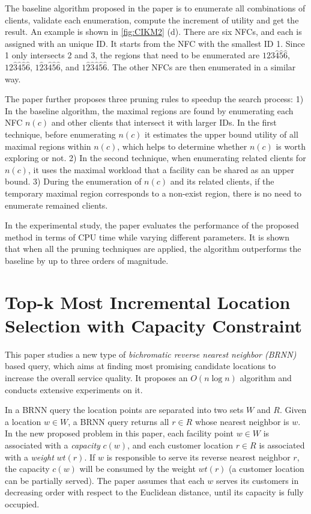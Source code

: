 \documentclass[paper=a4, fontsize=18pt]{article} %
\numberwithin{equation}{section} %
\numberwithin{figure}{section} %
\numberwithin{table}{section} %
\begin{document}
The baseline algorithm proposed in the paper is to enumerate all combinations of clients, validate each enumeration, compute the increment of utility and get the result. An example is shown in \ref{fig:CIKM2} (d). There are six NFCs, and each is assigned with an unique ID. It starts from the NFC with the smallest ID 1. Since 1 only intersects 2 and 3, the regions that need to be enumerated are $123\hat{4}\hat{5}\hat{6}$, $12\hat{3}\hat{4}\hat{5}\hat{6}$, $1\hat{2}3\hat{4}\hat{5}\hat{6}$, and $1\hat{2}\hat{3}\hat{4}\hat{5}\hat{6}$. The other NFCs are then enumerated in a similar way.

The paper further proposes three pruning rules to speedup the search process: 1) In the baseline algorithm, the maximal regions are found by enumerating each NFC $n(c)$ and other clients that intersect it with larger IDs. In the first technique, before enumerating $n(c)$ it estimates the upper bound utility of all maximal regions within $n(c)$, which helps to determine whether $n(c)$ is worth exploring or not. 2) In the second technique, when enumerating related clients for $n(c)$, it uses the maximal workload that a facility can be shared as an upper bound. 3) During the enumeration of $n(c)$ and its related clients, if the temporary maximal region corresponds to a non-exist region, there is no need to enumerate remained clients.

In the experimental study, the paper evaluates the performance of the proposed method in terms of CPU time while varying different parameters. It is shown that when all the pruning techniques are applied, the algorithm outperforms the baseline by up to three orders of magnitude.

\section{Top-k Most Incremental Location Selection with Capacity Constraint \cite{SHCDZ12}}

This paper studies a new type of \emph{bichromatic reverse nearest neighbor (BRNN)} based query, which aims at finding most promising candidate locations to increase the overall service quality. It proposes an $O(n \log n)$ algorithm and conducts extensive experiments on it.

In a BRNN query the location points are separated into two sets $W$ and $R$. Given a location $w \in W$, a BRNN query returns all $r \in R$ whose nearest neighbor is $w$. In the new proposed problem in this paper, each facility point $w \in W$ is associated with a \emph{capacity} $c(w)$, and each customer location $r \in R$ is associated with a \emph{weight} $wt(r)$. If $w$ is responsible to serve its reverse nearest neighbor $r$, the capacity $c(w)$ will be consumed by the weight $wt(r)$ (a customer location can be partially served). The paper  assumes that each $w$ serves its customers in decreasing order with respect to the Euclidean distance, until its capacity is fully occupied.
\end{document}
